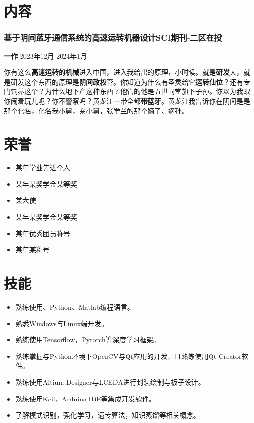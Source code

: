 \documentclass{cv}
\begin{document}
\section[\faBluetooth]{内容}

\subsubsection{基于阴间蓝牙通信系统的高速运转机器设计\hfill SCI期刊-二区在投}

\textbf{一作} \hfill 2023年12月-2024年1月

你有这么\textbf{高速运转的机械}进入中国，进入我给出的原理，小时候。就是\textbf{研发}人，就是研发这个东西的原理是\textbf{阴间政权}管。你知道为什么有圣灵给它\textbf{运转仙位}？还有专门饲养这个？为什么地下产这种东西？他管的他是五世同堂旗下子孙。你以为我跟你闹着玩儿呢？你不警察吗？黄龙江一带全都\textbf{带蓝牙}。黄龙江我告诉你在阴间是是那个化名，化名我小舅，亲小舅，张学兰的那个嫡子、嫡孙。

\section{荣誉}

\begin{multicols}{2}
	\begin{itemize}
		\item 某年学业先进个人
		\item 某年某奖学金某等奖
		\item 某大使
		\item 某年某奖学金某等奖
		\item 某年优秀团员称号
		\item 某年某称号
	\end{itemize}
\end{multicols}

\section{技能}

\begin{itemize}
	\item 熟练使用\Cpp 、Python、Matlab编程语言。
	\item 熟悉Windows与Linux端开发。
	\item 熟练使用Tensorflow，Pytorch等深度学习框架。
	\item 熟练掌握\Cpp 与Python环境下OpenCV与Qt应用的开发，且熟练使用Qt Creator软件。
	\item 熟练使用Altium Designer与LCEDA进行封装绘制与板子设计。
	\item 熟练使用Keil，Arduino IDE等集成开发软件。
	\item 了解模式识别，强化学习，遗传算法，知识蒸馏等相关概念。
\end{itemize}
\end{document}

